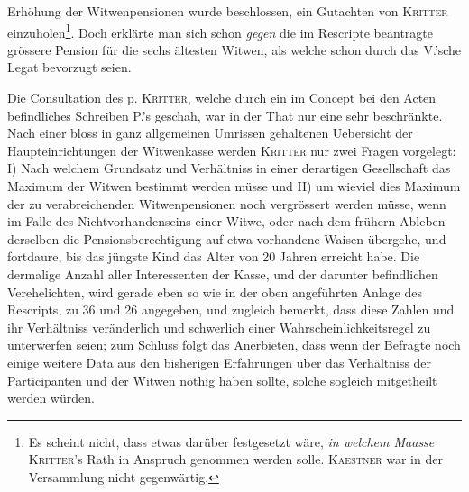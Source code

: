 Erhöhung der Witwenpensionen wurde beschlossen, ein Gutachten von \textsc{Kritter} einzuholen\footnote{Es scheint nicht, dass etwas darüber festgesetzt wäre, \textit{in welchem Maasse} \textsc{Kritter}’s Rath in Anspruch genommen werden solle. \textsc{Kaestner} war in der Versammlung nicht gegenwärtig.}. Doch erklärte man sich schon \textit{gegen} die im Rescripte beantragte grössere Pension für die sechs ältesten Witwen, als welche schon durch das V.’sche Legat bevorzugt seien.

Die Consultation des p. \textsc{Kritter}, welche durch ein im Concept bei den Acten befindliches Schreiben P.’s geschah, war in der That nur eine sehr beschränkte. Nach einer bloss in ganz allgemeinen Umrissen gehaltenen Uebersicht der Haupteinrichtungen der Witwenkasse werden \textsc{Kritter} nur zwei Fragen vorgelegt: I) Nach welchem Grundsatz und Verhältniss in einer derartigen Gesellschaft das Maximum der Witwen bestimmt werden müsse und II) um wieviel dies Maximum der zu verabreichenden Witwenpensionen noch vergrössert werden müsse, wenn im Falle des Nichtvorhandenseins einer Witwe, oder nach dem frühern Ableben derselben die Pensionsberechtigung auf etwa vorhandene Waisen übergehe, und fortdaure, bis das jüngste Kind das Alter von 20 Jahren erreicht habe. Die dermalige Anzahl aller Interessenten der Kasse, und der darunter befindlichen Verehelichten, wird gerade eben so wie in der oben angeführten Anlage des Rescripts, zu 36 und 26 angegeben, und zugleich bemerkt, dass diese Zahlen und ihr Verhältniss veränderlich und schwerlich einer Wahrscheinlichkeitsregel zu unterwerfen seien; zum Schluss folgt das Anerbieten, dass wenn der Befragte noch einige weitere Data aus den bisherigen Erfahrungen über das Verhältniss der Participanten und der Witwen nöthig haben sollte, solche sogleich mitgetheilt werden würden.

